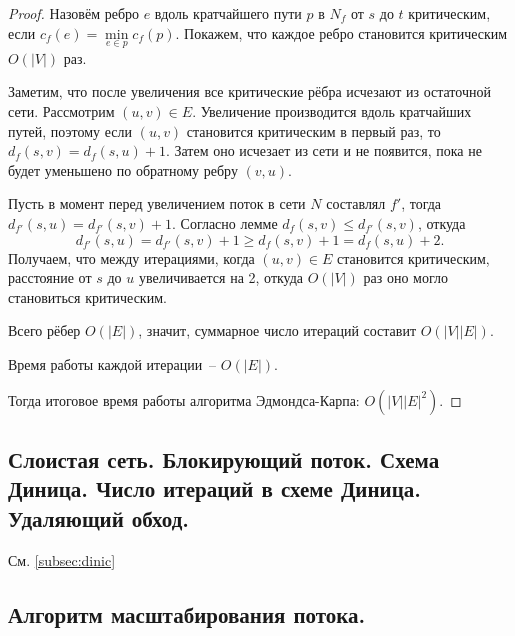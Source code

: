 \documentclass[a4paper,14pt]{article}
\begin{document}
    \begin{proof}
        Назовём ребро $e$ вдоль кратчайшего пути $p$ в $N_f$ от $s$ до $t$ критическим, если $c_f(e) = \min\limits_{e \in p} c_f(p)$. Покажем, что каждое ребро становится критическим $O(|V|)$ раз.

Заметим, что после увеличения все критические рёбра исчезают из остаточной сети. Рассмотрим $(u, v) \in E$. Увеличение производится вдоль кратчайших путей, поэтому если $(u, v)$ становится критическим в первый раз, то $d_f(s, v) = d_f(s, u) + 1$. Затем оно исчезает из сети и не появится, пока не будет уменьшено по обратному ребру $(v, u)$.

Пусть в момент перед увеличением поток в сети $N$ составлял $f'$, тогда $d_{f'}(s, u) = d_{f'}(s, v) + 1$. Согласно лемме $d_f(s, v) \leq d_{f'}(s, v)$, откуда
\[
d_{f'}(s, u) = d_{f'}(s, v) + 1 \geq d_f(s, v) + 1 = d_f(s, u) + 2.
\]
Получаем, что между итерациями, когда $(u, v) \in E$ становится критическим, расстояние от $s$ до $u$ увеличивается на 2, откуда $O(|V|)$ раз оно могло становиться критическим.

Всего рёбер $O(|E|)$, значит, суммарное число итераций составит $O(|V||E|)$.

Время работы каждой итерации~-- $O(|E|)$.

Тогда итоговое время работы алгоритма Эдмондса-Карпа: $O(|V||E|^2)$.

    \end{proof}
    \subsection{Слоистая сеть. Блокирующий поток. Схема Диница. Число итераций в схеме Диница. Удаляющий обход.}
    См. \ref{subsec:dinic}
    \subsection{Алгоритм масштабирования потока.}
\end{document}
